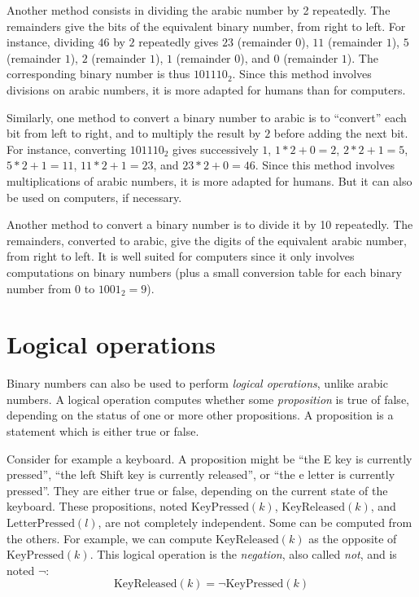Another method consists in dividing the arabic number by 2 repeatedly. The
remainders give the bits of the equivalent binary number, from right to left.
For instance, dividing $46$ by $2$ repeatedly gives $23$ (remainder $0$), $11$
(remainder $1$), $5$ (remainder $1$), $2$ (remainder $1$), $1$ (remainder $0$),
and $0$ (remainder $1$). The corresponding binary number is thus $101110_2$.
Since this method involves divisions on arabic numbers, it is more adapted for
humans than for computers.

Similarly, one method to convert a binary number to arabic is to ``convert''
each bit from left to right, and to multiply the result by $2$ before adding
the next bit. For instance, converting $101110_2$ gives successively $1$,
$1*2+0=2$, $2*2+1=5$, $5*2+1=11$, $11*2+1=23$, and $23*2+0=46$. Since this
method involves multiplications of arabic numbers, it is more adapted for
humans. But it can also be used on computers, if necessary.

Another method to convert a binary number is to divide it by 10 repeatedly. The
remainders, converted to arabic, give the digits of the equivalent arabic
number, from right to left. It is well suited for computers since it only
involves computations on binary numbers (plus a small conversion table for each
binary number from $0$ to $1001_2=9$).

\section{Logical operations}

Binary numbers can also be used to perform {\em logical operations}, unlike
arabic numbers. A logical operation computes whether some {\em proposition} is
true of false, depending on the status of one or more other propositions. A
proposition is a statement which is either true or false.

Consider for example a keyboard. A proposition might be ``the E key is
currently pressed'', ``the left Shift key is currently released'', or ``the e
letter is currently pressed''. They are either true or false, depending on the
current state of the keyboard. These propositions, noted
$\mathrm{KeyPressed}(k)$, $\mathrm{KeyReleased}(k)$, and
$\mathrm{LetterPressed}(l)$, are not completely independent. Some can be
computed from the others. For example, we can compute $\mathrm{KeyReleased}(k)$
as the opposite of $\mathrm{KeyPressed}(k)$. This logical operation is
the {\em negation}, also called {\em not}, and is noted $\neg$:
\begin{equation*}
  \mathrm{KeyReleased}(k) = \neg \mathrm{KeyPressed}(k)
\end{equation*}

